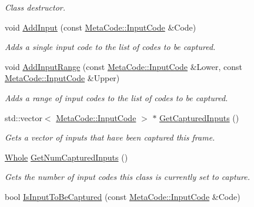 \begin{DoxyCompactItemize}
\begin{DoxyCompactList}\small\item\em Class destructor. \item\end{DoxyCompactList}\item 
void \hyperlink{classMezzanine_1_1UI_1_1InputCaptureData_a9d82c38caa461a6b92fd91d0eadf2a2a}{AddInput} (const \hyperlink{classMezzanine_1_1MetaCode_a3b5633f0145bf3287cf53a3f05b5563c}{MetaCode::InputCode} \&Code)
\begin{DoxyCompactList}\small\item\em Adds a single input code to the list of codes to be captured. \item\end{DoxyCompactList}\item 
void \hyperlink{classMezzanine_1_1UI_1_1InputCaptureData_a187f20c548df845953a8e067f0a3c9de}{AddInputRange} (const \hyperlink{classMezzanine_1_1MetaCode_a3b5633f0145bf3287cf53a3f05b5563c}{MetaCode::InputCode} \&Lower, const \hyperlink{classMezzanine_1_1MetaCode_a3b5633f0145bf3287cf53a3f05b5563c}{MetaCode::InputCode} \&Upper)
\begin{DoxyCompactList}\small\item\em Adds a range of input codes to the list of codes to be captured. \item\end{DoxyCompactList}\item 
std::vector$<$ \hyperlink{classMezzanine_1_1MetaCode_a3b5633f0145bf3287cf53a3f05b5563c}{MetaCode::InputCode} $>$ $\ast$ \hyperlink{classMezzanine_1_1UI_1_1InputCaptureData_ad34a3ed3c5072330b8d3ab3615060011}{GetCapturedInputs} ()
\begin{DoxyCompactList}\small\item\em Gets a vector of inputs that have been captured this frame. \item\end{DoxyCompactList}\item 
\hyperlink{namespaceMezzanine_adcbb6ce6d1eb4379d109e51171e2e493}{Whole} \hyperlink{classMezzanine_1_1UI_1_1InputCaptureData_a2a509eb5ff2db0e83174be5c966fb753}{GetNumCapturedInputs} ()
\begin{DoxyCompactList}\small\item\em Gets the number of input codes this class is currently set to capture. \item\end{DoxyCompactList}\item 
bool \hyperlink{classMezzanine_1_1UI_1_1InputCaptureData_a7a98f65e0666098367faf7d186a82e7f}{IsInputToBeCaptured} (const \hyperlink{classMezzanine_1_1MetaCode_a3b5633f0145bf3287cf53a3f05b5563c}{MetaCode::InputCode} \&Code)

\end{DoxyCompactItemize}
